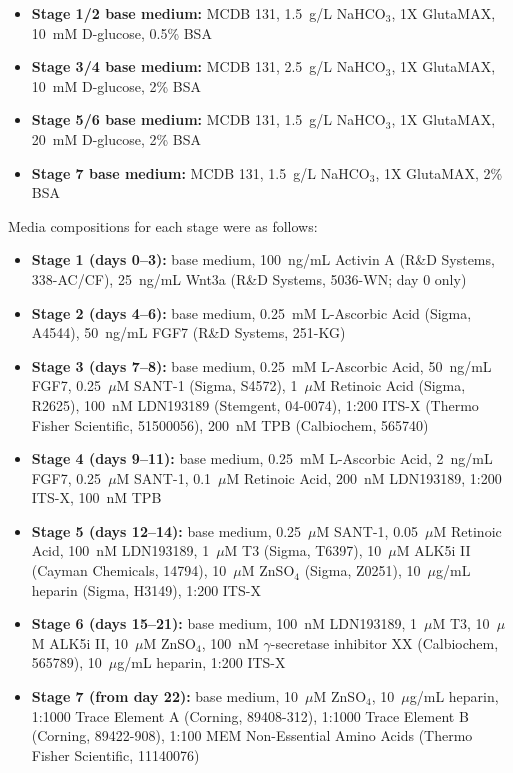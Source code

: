 \begin{itemize}
  \item \textbf{Stage 1/2 base medium:} MCDB 131, 1.5~g/L NaHCO$_3$, 1X GlutaMAX, 10~mM D-glucose, 0.5\% BSA
  \item \textbf{Stage 3/4 base medium:} MCDB 131, 2.5~g/L NaHCO$_3$, 1X GlutaMAX, 10~mM D-glucose, 2\% BSA
  \item \textbf{Stage 5/6 base medium:} MCDB 131, 1.5~g/L NaHCO$_3$, 1X GlutaMAX, 20~mM D-glucose, 2\% BSA
  \item \textbf{Stage 7 base medium:} MCDB 131, 1.5~g/L NaHCO$_3$, 1X GlutaMAX, 2\% BSA
\end{itemize}

Media compositions for each stage were as follows:

\begin{itemize}
  \item \textbf{Stage 1 (days 0–3):} base medium, 100~ng/mL Activin A (R\&D Systems, 338-AC/CF), 25~ng/mL Wnt3a (R\&D Systems, 5036-WN; day 0 only)
  \item \textbf{Stage 2 (days 4–6):} base medium, 0.25~mM L-Ascorbic Acid (Sigma, A4544), 50~ng/mL FGF7 (R\&D Systems, 251-KG)
  \item \textbf{Stage 3 (days 7–8):} base medium, 0.25~mM L-Ascorbic Acid, 50~ng/mL FGF7, 0.25~$\mu$M SANT-1 (Sigma, S4572), 1~$\mu$M Retinoic Acid (Sigma, R2625), 100~nM LDN193189 (Stemgent, 04-0074), 1:200 ITS-X (Thermo Fisher Scientific, 51500056), 200~nM TPB (Calbiochem, 565740)
  \item \textbf{Stage 4 (days 9–11):} base medium, 0.25~mM L-Ascorbic Acid, 2~ng/mL FGF7, 0.25~$\mu$M SANT-1, 0.1~$\mu$M Retinoic Acid, 200~nM LDN193189, 1:200 ITS-X, 100~nM TPB
  \item \textbf{Stage 5 (days 12–14):} base medium, 0.25~$\mu$M SANT-1, 0.05~$\mu$M Retinoic Acid, 100~nM LDN193189, 1~$\mu$M T3 (Sigma, T6397), 10~$\mu$M ALK5i II (Cayman Chemicals, 14794), 10~$\mu$M ZnSO$_4$ (Sigma, Z0251), 10~$\mu$g/mL heparin (Sigma, H3149), 1:200 ITS-X
  \item \textbf{Stage 6 (days 15–21):} base medium, 100~nM LDN193189, 1~$\mu$M T3, 10~$\mu$M ALK5i II, 10~$\mu$M ZnSO$_4$, 100~nM $\gamma$-secretase inhibitor XX (Calbiochem, 565789), 10~$\mu$g/mL heparin, 1:200 ITS-X
  \item \textbf{Stage 7 (from day 22):} base medium, 10~$\mu$M ZnSO$_4$, 10~$\mu$g/mL heparin, 1:1000 Trace Element A (Corning, 89408-312), 1:1000 Trace Element B (Corning, 89422-908), 1:100 MEM Non-Essential Amino Acids (Thermo Fisher Scientific, 11140076)
\end{itemize}

